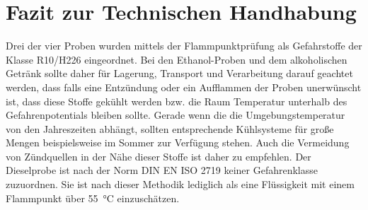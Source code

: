 \newpage
\section{Fazit zur Technischen Handhabung}
\label{sec:diskussion}
Drei der vier Proben wurden mittels der Flammpunktprüfung als Gefahrstoffe der Klasse R10/H226 eingeordnet. Bei den Ethanol-Proben und dem alkoholischen Getränk sollte daher für Lagerung, Transport und Verarbeitung darauf geachtet werden, dass falls eine Entzündung oder ein Aufflammen der Proben unerwünscht ist, dass diese Stoffe gekühlt werden bzw. die Raum Temperatur unterhalb des Gefahrenpotentials bleiben sollte. Gerade wenn die die Umgebungstemperatur von den Jahreszeiten abhängt, sollten entsprechende Kühlsysteme für große Mengen beispielsweise im Sommer zur Verfügung stehen. Auch die Vermeidung von Zündquellen in der Nähe dieser Stoffe ist daher zu empfehlen. Der Dieselprobe ist nach der Norm DIN EN ISO 2719 keiner Gefahrenklasse zuzuordnen. Sie ist nach dieser Methodik lediglich als eine Flüssigkeit mit einem Flammpunkt über \SI{55}{\celsius} einzuschätzen. 